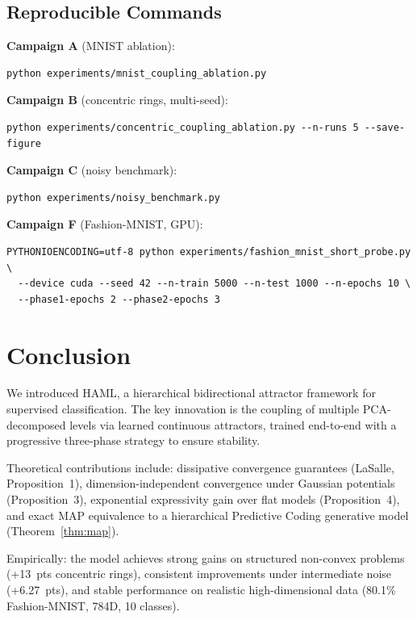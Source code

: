 \documentclass[11pt,a4paper]{article}
\begin{document}
\subsection{Reproducible Commands}

\textbf{Campaign A} (MNIST ablation):
\begin{verbatim}
python experiments/mnist_coupling_ablation.py
\end{verbatim}

\textbf{Campaign B} (concentric rings, multi-seed):
\begin{verbatim}
python experiments/concentric_coupling_ablation.py --n-runs 5 --save-figure
\end{verbatim}

\textbf{Campaign C} (noisy benchmark):
\begin{verbatim}
python experiments/noisy_benchmark.py
\end{verbatim}

\textbf{Campaign F} (Fashion-MNIST, GPU):
\begin{verbatim}
PYTHONIOENCODING=utf-8 python experiments/fashion_mnist_short_probe.py \
  --device cuda --seed 42 --n-train 5000 --n-test 1000 --n-epochs 10 \
  --phase1-epochs 2 --phase2-epochs 3
\end{verbatim}

\section{Conclusion}

We introduced HAML, a hierarchical bidirectional attractor framework for supervised
classification.  The key innovation is the coupling of multiple PCA-decomposed levels via
learned continuous attractors, trained end-to-end with a progressive three-phase strategy to
ensure stability.

Theoretical contributions include: dissipative convergence guarantees (LaSalle, Proposition~1),
dimension-independent convergence under Gaussian potentials (Proposition~3), exponential
expressivity gain over flat models (Proposition~4), and exact MAP equivalence to a hierarchical
Predictive Coding generative model (Theorem~\ref{thm:map}).

Empirically: the model achieves strong gains on structured non-convex problems (+13~pts
concentric rings), consistent improvements under intermediate noise (+6.27~pts), and stable
performance on realistic high-dimensional data (80.1\% Fashion-MNIST, 784D, 10 classes).
\end{document}
